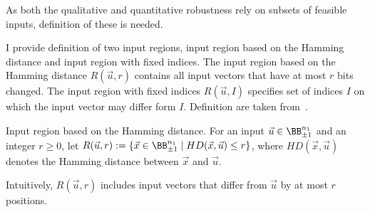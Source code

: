 As both the qualitative and quantitative robustness rely on subsets
of feasible inputs, definition of these is needed.

I provide definition of two input regions, input region based
on the Hamming distance and input region with fixed indices.
The input region based on the Hamming distance $R(\vec u, r)$ contains
all input vectors that have at most $r$ bits changed.
The input region with fixed indices $R(\vec u, I)$ specifies set of indices $I$
on which the input vector may differ form $I$.
Definition are taken from~\cite{zhang2021bdd4bnn}.

\begin{definition}{Input region based on the Hamming distance.}
For an input $\vec u\in \BB^{n_1}_{\pm 1}$ and an integer $r \geq 0$,
let $R(\vec u, r) := \{\vec x\in \BB^{n_1}_{\pm 1} \mid HD(\vec x, \vec u) \leq r \}$, where $HD(\vec x, \vec u)$ denotes the Hamming distance
between $\vec x$ and $\vec u$.
\end{definition}

Intuitively, $R(\vec u, r)$ includes input vectors that differ from $\vec u$ by at most
$r$ positions.


